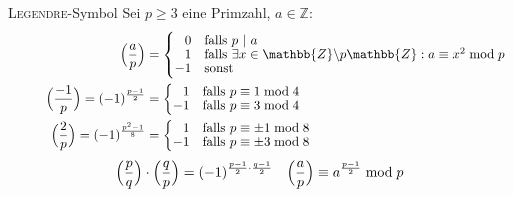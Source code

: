 \begin{algorithm}{\textsc{Legendre}-Symbol}
	Sei $p \geq 3$ eine Primzahl, $a \in \mathbb{Z}$:
	\vspace{-0.15cm}\begin{align*}
		\hspace*{3cm}\legendre{a}{p} &=
		\begin{cases*}
			\hphantom{-}0 & falls $p~\vert~a$ \\[-1ex]
			\hphantom{-}1 & falls $\exists x \in \mathbb{Z}\backslash p\mathbb{Z} : a \equiv x^2 \bmod p$ \\[-1ex]
			-1 & sonst
		\end{cases*} \\
		\legendre{-1}{p} = (-1)^{\frac{p - 1}{2}} &=
		\begin{cases*}
			\hphantom{-}1 & falls $p \equiv 1 \bmod 4$ \\[-1ex]
			-1 & falls $p \equiv 3 \bmod 4$
		\end{cases*} \\
		\legendre{2}{p} = (-1)^{\frac{p^2 - 1}{8}} &=
		\begin{cases*}
			\hphantom{-}1 & falls $p \equiv \pm 1 \bmod 8$ \\[-1ex]
			-1 & falls $p \equiv \pm 3 \bmod 8$
		\end{cases*}
	\end{align*}
	\begin{align*}
		\Bigl( \dfrac{p}{q} \Bigr) \cdot \Bigl( \dfrac{q}{p} \Bigr) = (-1)^{\frac{p - 1}{2} \cdot \frac{q - 1}{2}} &&
		\Bigl( \dfrac{a}{p} \Bigr) \equiv a^{\frac{p-1}{2}}\bmod p
	\end{align*}
	\vspace{-0.05cm}
\end{algorithm}

